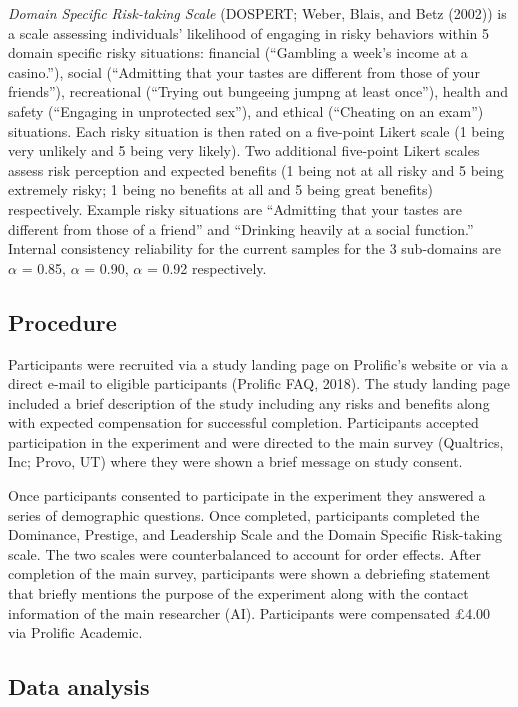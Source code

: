 \documentclass[
  english,
  man]{apa6}
\begin{document}
\emph{Domain Specific Risk-taking Scale} (DOSPERT; Weber, Blais, and Betz (2002)) is a scale assessing individuals' likelihood of engaging in risky behaviors within 5 domain specific risky situations: financial (``Gambling a week's income at a casino.''), social (``Admitting that your tastes are different from those of your friends''), recreational (``Trying out bungeeing jumpng at least once''), health and safety (``Engaging in unprotected sex''), and ethical (``Cheating on an exam'') situations. Each risky situation is then rated on a five-point Likert scale (1 being very unlikely and 5 being very likely). Two additional five-point Likert scales assess risk perception and expected benefits (1 being not at all risky and 5 being extremely risky; 1 being no benefits at all and 5 being great benefits) respectively. Example risky situations are ``Admitting that your tastes are different from those of a friend'' and ``Drinking heavily at a social function.'' Internal consistency reliability for the current samples for the 3 sub-domains are \(\alpha\) = 0.85, \(\alpha\) = 0.90, \(\alpha\) = 0.92 respectively.

\hypertarget{procedure}{%
\subsection{Procedure}\label{procedure}}

Participants were recruited via a study landing page on Prolific's website or via a direct e-mail to eligible participants (Prolific FAQ, 2018). The study landing page included a brief description of the study including any risks and benefits along with expected compensation for successful completion. Participants accepted participation in the experiment and were directed to the main survey (Qualtrics, Inc; Provo, UT) where they were shown a brief message on study consent.

Once participants consented to participate in the experiment they answered a series of demographic questions. Once completed, participants completed the Dominance, Prestige, and Leadership Scale and the Domain Specific Risk-taking scale. The two scales were counterbalanced to account for order effects. After completion of the main survey, participants were shown a debriefing statement that briefly mentions the purpose of the experiment along with the contact information of the main researcher (AI). Participants were compensated £4.00 via Prolific Academic.

\hypertarget{data-analysis}{%
\subsection{Data analysis}\label{data-analysis}}
\end{document}
